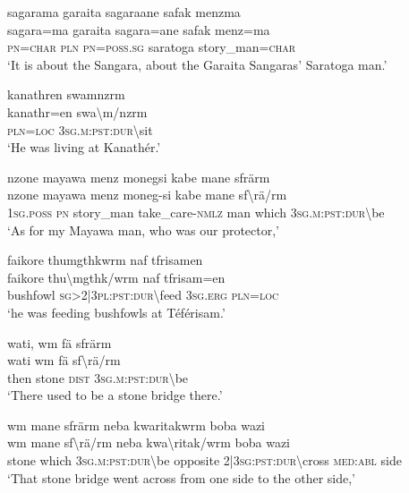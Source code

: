 \ea\label{ex:3:a7491}
sagarama garaita sagaraane safak menzma\\
\gll sagara=ma	garaita	sagara=ane	safak	menz=ma\\
     \textsc{pn}=\textsc{char}	\textsc{pln}	\textsc{pn}=\textsc{poss}.\textsc{sg}	saratoga	story\_man=\textsc{char}\\
\glt `It is about the Sangara, about the Garaita Sangaras' Saratoga man.'
\z

\ea\label{ex:3:a7493}
kanathren swamnzrm\\
\gll kanathr=en	swa{\textbackslash}m/nzrm\\
     \textsc{pln}=\textsc{loc}	3\textsc{sg}.\textsc{m}:\textsc{pst}:\textsc{dur}{\textbackslash}sit\\
\glt `He was living at Kanathér.'
\z

\ea\label{ex:3:a7494}
nzone mayawa menz monegsi kabe mane sfrärm\\
\gll nzone	mayawa	menz	moneg-si	kabe	mane	sf{\textbackslash}rä/rm\\
     1\textsc{sg}.\textsc{poss}	\textsc{pn}	story\_man	take\_care-\textsc{nmlz}	man	which	3\textsc{sg}.\textsc{m}:\textsc{pst}:\textsc{dur}{\textbackslash}be\\
\glt `As for my Mayawa man, who was our protector,'
\z

\ea\label{ex:3:a7496}
faikore thumgthkwrm naf tfrisamen\\
\gll faikore	thu{\textbackslash}mgthk/wrm	naf	tfrisam=en\\
     bushfowl	\textsc{sg}>2|3\textsc{pl}:\textsc{pst}:\textsc{dur}{\textbackslash}feed	3\textsc{sg}.\textsc{erg}	\textsc{pln}=\textsc{loc}\\
\glt `he was feeding bushfowls at Téférisam.'
\z

\ea\label{ex:3:a7498}
wati, wm fä sfrärm\\
\gll wati	wm	fä	sf{\textbackslash}rä/rm\\
     then	stone	\textsc{dist}	3\textsc{sg}.\textsc{m}:\textsc{pst}:\textsc{dur}{\textbackslash}be\\
\glt `There used to be a stone bridge there.'
\z

\ea\label{ex:3:a7499}
wm mane sfrärm neba kwaritakwrm boba wazi\\
\gll wm	mane	sf{\textbackslash}rä/rm	neba	kwa{\textbackslash}ritak/wrm	boba	wazi\\
     stone	which	3\textsc{sg}.\textsc{m}:\textsc{pst}:\textsc{dur}{\textbackslash}be	opposite	2|3\textsc{sg}:\textsc{pst}:\textsc{dur}{\textbackslash}cross	\textsc{med}:\textsc{abl}	side\\
\glt `That stone bridge went across from one side to the other side,'
\z

